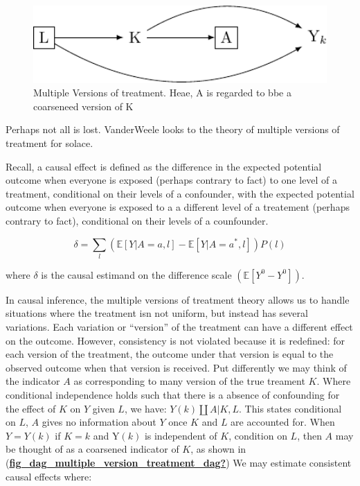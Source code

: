 \documentclass[
  singlecolumn]{report}
\begin{document}
\begin{figure}

{\centering \includegraphics[width=1\textwidth,height=\textheight]{causal-dags_files/figure-pdf/fig_dag_multiple_version_treatment_dag-1.pdf}

}

\caption{Multiple Versions of treatment. Heae, A is regarded to bbe a
coarseneed version of K}

\end{figure}

Perhaps not all is lost. VanderWeele looks to the theory of multiple
versions of treatment for solace.

Recall, a causal effect is defined as the difference in the expected
potential outcome when everyone is exposed (perhaps contrary to fact) to
one level of a treatment, conditional on their levels of a confounder,
with the expected potential outcome when everyone is exposed to a a
different level of a treatement (perhaps contrary to fact), conditional
on their levels of a counfounder.

\[ \delta = \sum_l \left( \mathbb{E}[Y|A=a,l] - \mathbb{E}[Y|A=a^*,l] \right) P(l)\]

where \(\delta\) is the causal estimand on the difference scale
\((\mathbb{E}[Y^0 - Y^0])\).

In causal inference, the multiple versions of treatment theory allows us
to handle situations where the treatment isn not uniform, but instead
has several variations. Each variation or ``version'' of the treatment
can have a different effect on the outcome. However, consistency is not
violated because it is redefined: for each version of the treatment, the
outcome under that version is equal to the observed outcome when that
version is received. Put differently we may think of the indicator \(A\)
as corresponding to many version of the true treament \(K\). Where
conditional independence holds such that there is a absence of
confounding for the effect of \(K\) on \(Y\) given \(L\), we have:
\(Y(k)\coprod A|K,L\). This states conditional on \(L\), \(A\) gives no
information about \(Y\) once \(K\) and \(L\) are accounted for. When
\(Y = Y(k)\) if \(K = k\) and Y\((k)\) is independent of \(K\),
condition on \(L\), then \(A\) may be thought of as a coarsened
indicator of \(K\), as shown in
(\protect\hyperlink{ref-fig_dag_multiple_version_treatment_dag}{\textbf{fig\_dag\_multiple\_version\_treatment\_dag?}})
We may estimate consistent causal effects where:
\end{document}
